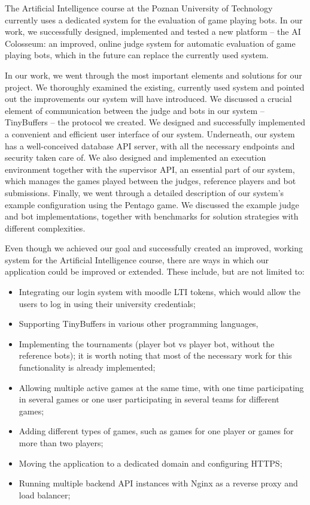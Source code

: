 
The Artificial Intelligence course at the Poznan University of Technology currently uses a dedicated system for the evaluation of game playing bots. In our work, we successfully designed, implemented and tested a new platform -- the AI Colosseum: an improved, online judge system for automatic evaluation of game playing bots, which in the future can replace the currently used system.

In our work, we went through the most important elements and solutions for our project. We thoroughly examined the existing, currently used system and pointed out the improvements our system will have introduced. We discussed a crucial element of communication between the judge and bots in our system -- TinyBuffers -- the protocol we created.  We designed and successfully implemented a convenient and efficient user interface of our system. Underneath, our system has a well-conceived database API server, with all the necessary endpoints and security taken care of. We also designed and implemented an execution environment together with the supervisor API, an essential part of our system, which manages the games played between the judges, reference players and bot submissions. Finally, we went through a detailed description of our system's example configuration using the Pentago game. We discussed the example judge and bot implementations, together with benchmarks for solution strategies with different complexities.

Even though we achieved our goal and successfully created an improved, working system for the Artificial Intelligence course, there are ways in which our application could be improved or extended. These include, but are not limited to:
\begin{itemize}
    \item Integrating our login system with moodle LTI tokens, which would allow the users to log in using their university credentials;
    \item Supporting TinyBuffers in various other programming languages,
    \item Implementing the tournaments (player bot vs player bot, without the reference bots); it is worth noting that most of the necessary work for this functionality is already implemented;
    \item Allowing multiple active games at the same time, with one time participating in several games or one user participating in several teams for different games;
    \item Adding different types of games, such as games for one player or games for more than two players;
    \item Moving the application to a dedicated domain and configuring HTTPS;
    \item Running multiple backend API instances with Nginx as a reverse proxy and load balancer;
\end{itemize}


